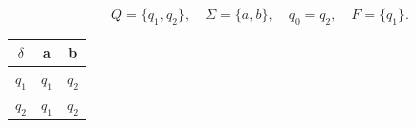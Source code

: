 \documentclass[10pt,letterpaper,unboxed,cm]{article}
\begin{document}
\begin{enumerate}
\[
Q = \{q_1, q_2\}, \quad \Sigma = \{a,b\}, \quad q_0 = q_2, \quad F = \{q_1\}.
\]

\begin{center}
\begin{tabular}{||c||c c||}
\hline
$\delta$ & a & b \\
\hline\hline
$q_1$ & $q_1$ & $q_2$ \\
\hline
$q_2$ & $q_1$ & $q_2$ \\
\hline
\end{tabular}
\end{center}

\end{enumerate}
\end{document}
